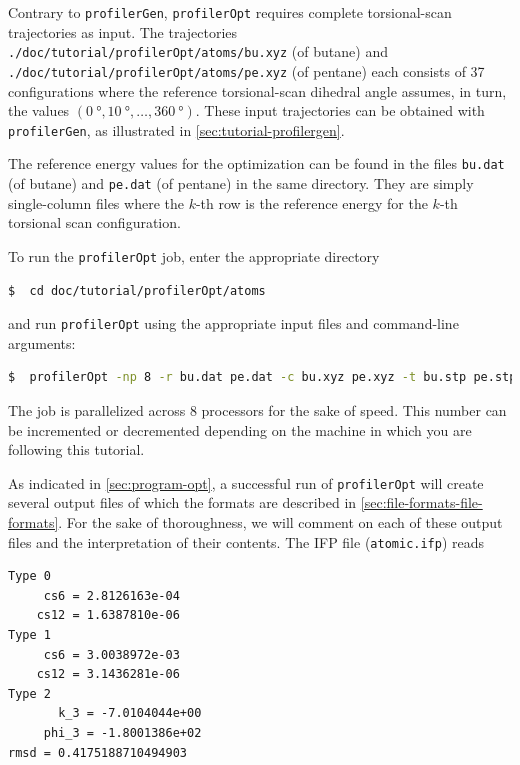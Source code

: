\documentclass[10pt,a4paper,openany]{memoir}
\numberwithin{equation}{section}
\newcommand{\profileropt}[0]{\texttt{profilerOpt}}
\newcommand{\profilergen}[0]{\texttt{profilerGen}}
\begin{document}
Contrary to \profilergen{}, \profileropt{} requires complete torsional-scan
trajectories as input. The trajectories
\texttt{./doc/tutorial/profilerOpt/atoms/bu.xyz} (of butane) and
\texttt{./doc/tutorial/profilerOpt/atoms/pe.xyz} (of pentane) each consists of
37 configurations where the reference torsional-scan dihedral angle assumes, in
turn, the values
$(\SI{0}{\degree}, \SI{10}{\degree}, \ldots, \SI{360}{\degree})$.  These input
trajectories can be obtained with \profilergen{}, as illustrated in
\autoref{sec:tutorial-profilergen}.

The reference energy values for the optimization can be found in the files
\texttt{bu.dat} (of butane) and \texttt{pe.dat} (of pentane) in the same
directory. They are simply single-column files where the $k$-th row is the
reference energy for the $k$-th torsional scan configuration.

To run the \profileropt{} job, enter the appropriate directory

\begin{lstlisting}[language=bash]
$  cd doc/tutorial/profilerOpt/atoms
\end{lstlisting}\vspace{2ex}\par

\noindent
and run \profileropt{} using the appropriate input files and 
command-line arguments:

\begin{lstlisting}[language=bash]
$  profilerOpt -np 8 -r bu.dat pe.dat -c bu.xyz pe.xyz -t bu.stp pe.stp -i run.inp -op atomic
\end{lstlisting}\vspace{2ex}\par

\noindent
The job is parallelized across 8 processors for the sake of speed.
This number can be incremented or decremented depending on the machine
in which you are following this tutorial.

As indicated in \autoref{sec:program-opt}, a successful run of
\profileropt{} will create several output files of which the formats
are described in \autoref{sec:file-formats-file-formats}.
%
For the sake of thoroughness, we will comment on each of these output
files and the interpretation of their contents.
%
The IFP file (\texttt{atomic.ifp}) reads

\begin{lstlisting}[language=gromacs]
Type 0
     cs6 = 2.8126163e-04     
    cs12 = 1.6387810e-06     
Type 1
     cs6 = 3.0038972e-03     
    cs12 = 3.1436281e-06     
Type 2
       k_3 = -7.0104044e+00    
     phi_3 = -1.8001386e+02    
rmsd = 0.4175188710494903
\end{lstlisting}\vspace{2ex}\par
\end{document}
